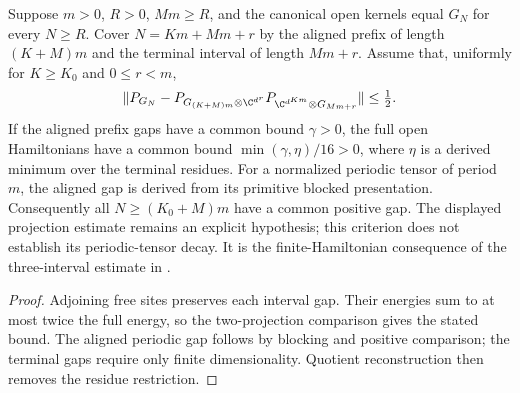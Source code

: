 \begin{lemma}
    \label{thm:open_residue_cover_gap_criterion}
    \leanok
    Suppose $m>0$, $R>0$, $Mm\ge R$, and the canonical open kernels equal
    $G_N$ for every $N\ge R$. Cover $N=Km+Mm+r$ by the aligned prefix
    of length $(K+M)m$ and the terminal interval of length $Mm+r$.
    Assume that, uniformly for $K\ge K_0$ and $0\le r<m$,
    \begin{align}
        \|P_{G_N}-P_{G_{(K+M)m}\otimes\C^{d^r}}
        P_{\C^{d^{Km}}\otimes G_{Mm+r}}\|\le\tfrac12.
        \notag
    \end{align}
    If the aligned prefix gaps have a common bound $\gamma>0$, the full open
    Hamiltonians have a common bound $\min(\gamma,\eta)/16>0$, where $\eta$
    is a derived minimum over the terminal residues. For a normalized periodic
    tensor of period $m$, the aligned gap is derived from its primitive blocked
    presentation. Consequently all $N\ge(K_0+M)m$ have a common positive gap.
    The displayed projection estimate remains an explicit hypothesis; this
    criterion does not establish its periodic-tensor decay.
    It is the finite-Hamiltonian consequence of the three-interval estimate in
    \cite[Section~6, Lemma commutation(ii)]{Nachtergaele1996Spectral}.
\end{lemma}
\begin{proof}\leanok
    Adjoining free sites preserves each interval gap. Their energies sum to at
    most twice the full energy, so the two-projection comparison gives the stated
    bound. The aligned periodic gap follows by blocking and positive comparison;
    the terminal gaps require only finite dimensionality. Quotient reconstruction
    then removes the residue restriction.
\end{proof}

